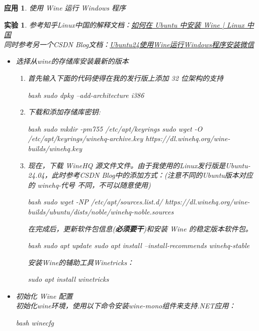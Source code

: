 \documentclass[12pt]{ctexart}
\newtheorem{application}{应用}
\newtheorem{experiment}{实验}
\begin{document}
	\begin{application}
		使用 Wine 运行 Windows 程序
	\end{application}
	\begin{experiment}
		参考知乎Linux中国的解释文档：\cite{linux-zhihu}\href{https://zhuanlan.zhihu.com/p/645456382}{如何在 Ubuntu 中安装 Wine | Linux 中国}\\
		同时参考另一个CSDN Blog文档：\cite{wine-csdn}\href{https://blog.csdn.net/XiaoYuHaoAiMin/article/details/141901660}{Ubuntu24使用Wine运行Windows程序安装微信}
		\begin{itemize}
		\item 选择从wine的存储库安装最新的版本
		\begin{enumerate}
			\item 首先输入下面的代码使得在我的发行版上添加 32 位架构的支持
			\begin{codeblock}{bash}
sudo dpkg --add-architecture i386
			\end{codeblock}
			\item 下载和添加存储库密钥:
			\begin{codeblock}{bash}
sudo mkdir -pm755 /etc/apt/keyrings
sudo wget -O /etc/apt/keyrings/winehq-archive.key https://dl.winehq.org/wine-builds/winehq.key
			\end{codeblock}
			\item 现在，下载 WineHQ 源文件文件。由于我使用的Linux发行版是Ubuntu-24.04，此时参考CSDN Blog中的添加方式：(注意不同的Ubuntu版本对应的 winehq-代号 不同，不可以随意使用)
			\begin{codeblock}{bash}
sudo wget -NP /etc/apt/sources.list.d/ https://dl.winehq.org/wine-builds/ubuntu/dists/noble/winehq-noble.sources
			\end{codeblock}
			在完成后，更新软件包信息(\textbf{必须要干})和安装 Wine 的稳定版本软件包。
			\begin{codeblock}{bash}
sudo apt update
sudo apt install --install-recommends winehq-stable
			\end{codeblock}
			安装Wine的辅助工具Winetricks：
			\begin{codeblock}
sudo apt install winetricks
			\end{codeblock}
		\end{enumerate}
		\item 初始化 Wine 配置\\
		\hspace*{2em}初始化wine环境，使用以下命令安装wine-mono组件来支持.NET应用：
		\begin{codeblock}{bash}
winecfg
		\end{codeblock}

\end{itemize}
\end{experiment}
\end{document}

